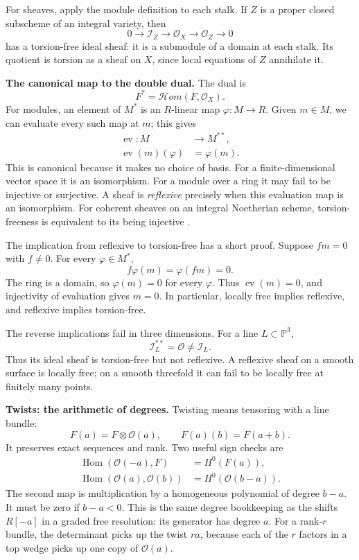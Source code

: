\documentclass[11pt,a4paper]{article}
\theoremstyle{remark}
\begin{document}
For sheaves, apply the module definition
to each stalk. If $Z$ is a proper closed
subscheme of an integral variety, then
$$
0\longrightarrow\mathcal{I}_Z
\longrightarrow\mathcal{O}_X
\longrightarrow\mathcal{O}_Z
\longrightarrow0
$$
has a torsion-free ideal sheaf: it is
a submodule of a domain at each stalk.
Its quotient is torsion as a sheaf on
$X$, since local equations of $Z$
annihilate it.

\textbf{The canonical map to the
 double dual.}
The dual is
$$
F^*=\mathcal{H}om(F,\mathcal{O}_X).
$$
For modules, an element of $M^*$ is
an $R$-linear map $\varphi:M\to R$.
Given $m\in M$, we can evaluate every
such map at $m$; this gives
$$
\begin{aligned}
\operatorname{ev}:M&\longrightarrow M^{**},\\
\operatorname{ev}(m)(\varphi)&=\varphi(m).
\end{aligned}
$$
This is canonical because it makes no
choice of basis. For a finite-dimensional
vector space it is an isomorphism.
For a module over a ring it may fail
to be injective or surjective.
A sheaf is \emph{reflexive} precisely
when this evaluation map is an
isomorphism. For coherent sheaves on
an integral Noetherian scheme,
torsion-freeness is equivalent to its
being injective \cite{stacks}.

The implication from reflexive to
torsion-free has a short proof.
Suppose $fm=0$ with $f\ne0$.
For every $\varphi\in M^*$,
$$
f\varphi(m)=\varphi(fm)=0.
$$
The ring is a domain, so
$\varphi(m)=0$ for every $\varphi$.
Thus $\operatorname{ev}(m)=0$, and
injectivity of evaluation gives $m=0$.
In particular, locally free implies
reflexive, and reflexive implies
torsion-free.

The reverse implications fail in
three dimensions. For a line
$L\subset\mathbb{P}^3$,
$$
\mathcal{I}_L^{**}=\mathcal{O}
\ne\mathcal{I}_L.
$$
Thus its ideal sheaf is torsion-free
but not reflexive. A reflexive sheaf
on a smooth surface is locally free;
on a smooth threefold it can fail to
be locally free at finitely many points.

\textbf{Twists: the arithmetic of degrees.}
Twisting means tensoring with a line
bundle:
$$
F(a)=F\otimes\mathcal{O}(a),\qquad
F(a)(b)=F(a+b).
$$
It preserves exact sequences and rank.
Two useful sign checks are
$$
\begin{aligned}
\operatorname{Hom}(\mathcal{O}(-a),F)
&=H^0(F(a)),\\
\operatorname{Hom}
(\mathcal{O}(a),\mathcal{O}(b))
&=H^0(\mathcal{O}(b-a)).
\end{aligned}
$$
The second map is multiplication by
a homogeneous polynomial of degree
$b-a$. It must be zero if $b-a<0$.
This is the same degree bookkeeping
as the shifts $R[-a]$ in a graded
free resolution: its generator has
degree $a$.
For a rank-$r$ bundle, the determinant
picks up the twist $ra$, because each
of the $r$ factors in a top wedge
picks up one copy of $\mathcal{O}(a)$.
\end{document}
